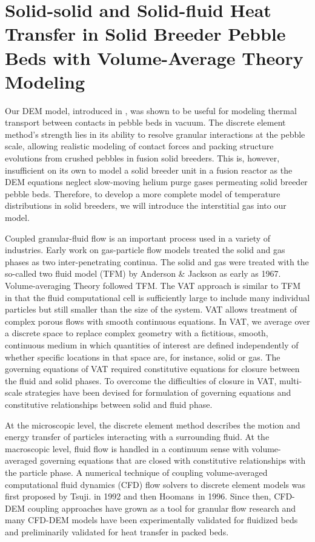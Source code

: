 \chapter{Solid-solid and Solid-fluid Heat Transfer in Solid Breeder Pebble Beds with Volume-Average Theory Modeling}\label{ch:cfd-dem-modeling-development}
Our DEM model, introduced in , was shown to be useful for modeling thermal transport between contacts in pebble beds in vacuum. The discrete element method's strength lies in its ability to resolve granular interactions at the pebble scale, allowing realistic modeling of contact forces and packing structure evolutions from crushed pebbles in fusion solid breeders. This is, however, insufficient on its own to model a solid breeder unit in a fusion reactor as the DEM equations neglect slow-moving helium purge gases permeating solid breeder pebble beds. Therefore, to develop a more complete model of temperature distributions in solid breeders, we will introduce the interstitial gas into our model.

Coupled granular-fluid flow is an important process used in a variety of industries.\cite{Zhou2010,Kloss2012} Early work on gas-particle flow models treated the solid and gas phases as two inter-penetrating continua. The solid and gas were treated with the so-called two fluid model (TFM) by Anderson \& Jackson as early as 1967.\cite{Anderson1967} Volume-averaging Theory followed TFM. The VAT approach is similar to TFM in that the fluid computational cell is sufficiently large to include many individual particles but still smaller than the size of the system.\cite{Enwald1996} VAT allows treatment of complex porous flows with smooth continuous equations. In VAT, we average over a discrete space to replace complex geometry with a fictitious, smooth, continuous medium in which quantities of interest are defined independently of whether specific locations in that space are, for instance, solid or gas.\cite{Sbutega2013,whitaker1999method} The governing equations of VAT required constitutive equations for closure between the fluid and solid phases. To overcome the difficulties of closure in VAT, multi-scale strategies have been devised for formulation of governing equations and constitutive relationships between solid and fluid phase. 

At the microscopic level, the discrete element method describes the motion and energy transfer of particles interacting with a surrounding fluid. At the macroscopic level, fluid flow is handled in a continuum sense with volume-averaged governing equations that are closed with constitutive relationships with the particle phase.\cite{Tsuji1992,Xu1997} A numerical technique of coupling volume-averaged computational fluid dynamics (CFD) flow solvers to discrete element models was first proposed by Tsuji\etal. in 1992 and then Hoomans\etal~in 1996.\cite{Tsuji1992,Tsuji1993,Hoomans1996} Since then, CFD-DEM coupling approaches have grown as a tool for granular flow research and many CFD-DEM models have been experimentally validated for fluidized beds and preliminarily validated for heat transfer in packed beds.\cite{Kloss2012,Xu1997,Patankar2001,Swasdisevi2005,Deen2007,Zhang2008,Chu2008,VanBuijtenen2011,Gruber2012,Peng2014}


